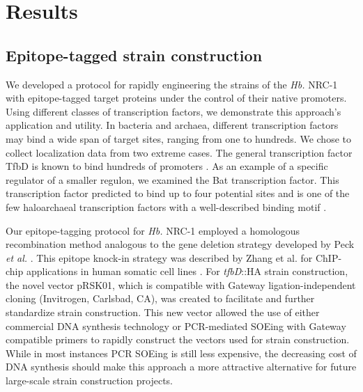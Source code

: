 \section{Results}

\subsection{Epitope-tagged strain construction}

We developed a protocol for rapidly engineering the strains of the {\em Hb.} NRC-1 with epitope-tagged target proteins under the control of their native promoters. Using different classes of transcription factors, we demonstrate this approach’s application and utility. In bacteria and archaea, different transcription factors may bind a wide span of target sites, ranging from one to hundreds. We chose to collect localization data from two extreme cases. The general transcription factor TfbD is known to bind hundreds of promoters \cite{facciotti_general_2007}. As an example of a specific regulator of a smaller regulon, we examined the Bat transcription factor. This transcription factor predicted to bind up to four potential sites and is one of the few haloarchaeal transcription factors with a well-described binding motif \cite{baliga_genomic_2001}.

Our epitope-tagging protocol for {\em Hb.} NRC-1 employed a homologous recombination method analogous to the gene deletion strategy developed by Peck {\em et al.} \cite{peck_homologous_2000}. This epitope knock-in strategy was described by Zhang et al. for ChIP-chip applications in human somatic cell lines \cite{zhang2008epitope}. For {\em tfbD}::HA strain construction, the novel vector pRSK01, which is compatible with Gateway ligation-independent cloning (Invitrogen, Carlsbad, CA), was created to facilitate and further standardize strain construction. This new vector allowed the use of either commercial DNA synthesis technology or PCR-mediated SOEing \cite{horton1989engineering} with Gateway compatible primers to rapidly construct the vectors used for strain construction. While in most instances PCR SOEing is still less expensive, the decreasing cost of DNA synthesis should make this approach a more attractive alternative for future large-scale strain construction projects.

